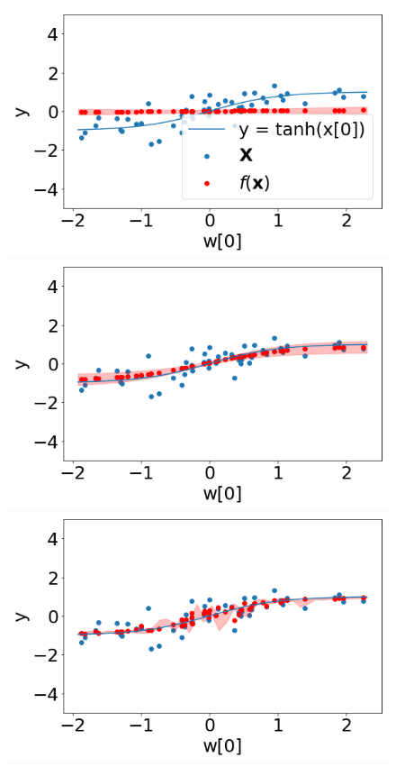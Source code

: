 \begin{figure}
 \begin{minipage}[]{.3\textwidth}
    \includegraphics[width=\textwidth]{plots/experiment_structures/plot_0_2kld.png}
\subcaption{}
\end{minipage}
 \begin{minipage}{.3\textwidth}
    \includegraphics[width=\textwidth]{plots/experiment_structures/plot_0_2elbo.png}
\subcaption{}
\end{minipage}
 \begin{minipage}{.3\textwidth}
    \includegraphics[width=\textwidth]{plots/experiment_structures/plot_0_2overfit.png}
\subcaption{}
\end{minipage}


\end{figure}
